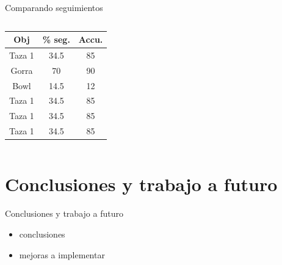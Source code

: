 \documentclass[]{beamer}
\begin{document}
\begin{frame}[t]{Comparando seguimientos}
    \begin{columns}
        \begin{column}{4cm}
            \begin{tabular}{|c|c|c|}
                \hline
                Obj     & \% seg. & Accu. \\
                \hline
                Taza 1  & 34.5    & 85    \\
                \hline
                Gorra   & 70      & 90    \\
                \hline
                Bowl    & 14.5    & 12    \\
                \hline
                \hline
                Taza 1  & 34.5    & 85    \\
                \hline
                Taza 1  & 34.5    & 85    \\
                \hline
                Taza 1  & 34.5    & 85    \\
                \hline
            \end{tabular}
        \end{column}
    \end{columns}
\end{frame}

\section{Conclusiones y trabajo a futuro}
\begin{frame}{Conclusiones y trabajo a futuro}
    \begin{itemize}
        \item conclusiones
        \item mejoras a implementar
    \end{itemize}
\end{frame}
\end{document}
